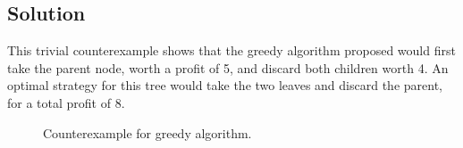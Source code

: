 \subsection*{Solution}
This trivial counterexample shows that the greedy algorithm proposed would first take the parent node, worth a profit of 5, and discard both children worth 4. An optimal strategy for this tree would take the two leaves and discard the parent, for a total profit of 8.
\begin{figure}[h]
\centering
\caption{Counterexample for greedy algorithm. \label{fig:simple}}
{
}
\end{figure}
